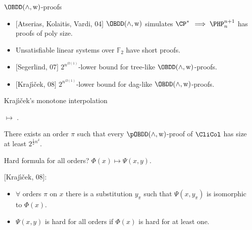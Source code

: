 \begin{frame}{$\OBDD(\land, \weakening)$-proofs}
    \begin{itemize}
        \item{} [Atserias, Kolaitis, Vardi, 04] $\OBDD(\land, \weakening)$ simulates $\CP^*$
            \pause $\implies \PHP^{n + 1}_n$ has proofs of poly size.
        \pause
        \item{} Unsatisfiable linear systems over $\mathbb{F}_2$ have short proofs.
        \pause
        \item{} [Segerlind, 07] $2^{n^{\Omega(1)}}$-lower bound for tree-like $\OBDD(\land,
            \weakening)$-proofs.
        \item{} [Kraj{\'{\i}}{\v{c}}ek, 08] $2^{n^{\Omega(1)}}$-lower bound for dag-like $\OBDD(\land,
            \weakening)$-proofs.
    \end{itemize}
\end{frame}

\begin{frame}{Kraj{\'{\i}}{\v{c}}ek's monotone interpolation}

     $\mapsto$
    .

    \pause

    \begin{theorem}[Kraj{\'{\i}}{\v{c}}ek, 08]
        There exists an order $\pi$ such that every $\pOBDD(\land, \weakening)$-proof of $\CliCol$ has
        size at least $2^{\frac{1}{2} n^\delta}$.
    \end{theorem}

    \pause
    Hard formula for all orders? \pause $\Phi(x) \mapsto \Psi(x, y)$.

    \pause
    {[Kraj{\'{\i}}{\v{c}}ek, 08]}:
    \begin{itemize}
        \item $\forall$ orders $\pi$ on $x$ there is a substitution $y_{\pi}$ such that $\Psi(x,
            y_{\pi})$ is isomorphic to $\Phi(x)$.
        \item $\Psi(x, y)$ is hard for all orders if $\Phi(x)$ is hard for at least one.
    \end{itemize}
\end{frame}


